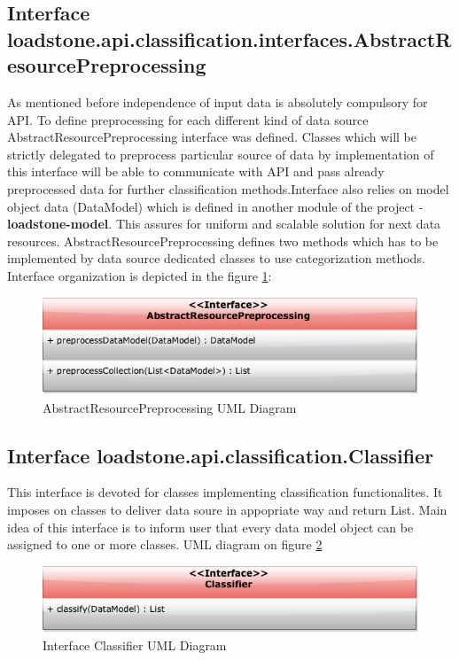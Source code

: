 \subsection{Interface \newline loadstone.api.classification.interfaces.\newline AbstractResourcePreprocessing}
As mentioned before independence of input data is absolutely compulsory for API. To define preprocessing for each different kind of data source  AbstractResourcePreprocessing interface was defined. Classes which will be strictly delegated to preprocess particular source of data by implementation of this interface will be able to communicate with API and pass already preprocessed data for further classification methods.Interface also relies on model object data (DataModel) which is defined in another module of the project - \textbf{loadstone-model}. This assures for uniform and scalable solution for next data resources. AbstractResourcePreprocessing defines two methods which has to be implemented by data source dedicated classes to use categorization methods. Interface organization is depicted in the figure \ref{fig:@=AbstractResourcePreprocessing}:
\begin{figure}[h]
	\centering
	\includegraphics[scale=0.5]{AbstractResourcePreprocessing.png}
	\caption{AbstractResourcePreprocessing UML Diagram}
	\label{fig:@=AbstractResourcePreprocessing}
\end{figure}
\subsection{Interface \newline loadstone.api.classification.Classifier}
This interface is devoted for classes implementing classification functionalites. It imposes on classes to deliver data soure in appopriate way and return List. Main idea of this interface is to inform user that every data model object can be assigned to one or more classes. UML diagram on figure \ref{fig:@=classifier}
\begin{figure}[h]
	\centering
	\includegraphics[scale=0.5]{classifier_interface.png}
	\caption{Interface Classifier UML Diagram}
	\label{fig:@=classifier}
\end{figure}
